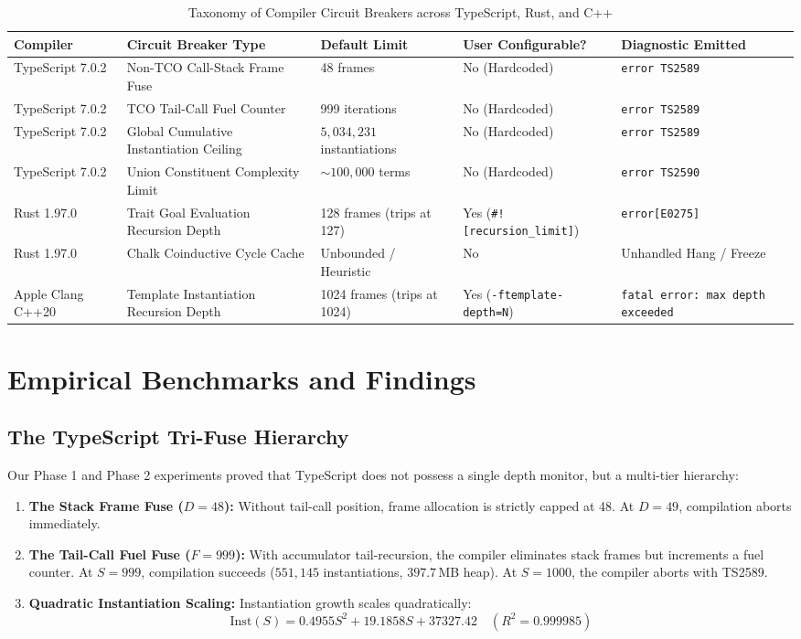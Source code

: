 \documentclass[10pt,journal,compsoc]{IEEEtran}
\begin{document}
\begin{table}[t]
\centering
\caption{Taxonomy of Compiler Circuit Breakers across TypeScript, Rust, and C++}
\label{tab:circuit_breakers}
\begin{tabular}{@{}lllll@{}}
\toprule
\textbf{Compiler} & \textbf{Circuit Breaker Type} & \textbf{Default Limit} & \textbf{User Configurable?} & \textbf{Diagnostic Emitted} \\ \midrule
TypeScript 7.0.2 & Non-TCO Call-Stack Frame Fuse & 48 frames & No (Hardcoded) & \texttt{error TS2589} \\
TypeScript 7.0.2 & TCO Tail-Call Fuel Counter & 999 iterations & No (Hardcoded) & \texttt{error TS2589} \\
TypeScript 7.0.2 & Global Cumulative Instantiation Ceiling & $5,034,231$ instantiations & No (Hardcoded) & \texttt{error TS2589} \\
TypeScript 7.0.2 & Union Constituent Complexity Limit & $\sim 100,000$ terms & No (Hardcoded) & \texttt{error TS2590} \\
Rust 1.97.0 & Trait Goal Evaluation Recursion Depth & 128 frames (trips at 127) & Yes (\texttt{\#![recursion\_limit]}) & \texttt{error[E0275]} \\
Rust 1.97.0 & Chalk Coinductive Cycle Cache & Unbounded / Heuristic & No & Unhandled Hang / Freeze \\
Apple Clang C++20 & Template Instantiation Recursion Depth & 1024 frames (trips at 1024) & Yes (\texttt{-ftemplate-depth=N}) & \texttt{fatal error: max depth exceeded} \\ \bottomrule
\end{tabular}
\end{table}

\section{Empirical Benchmarks and Findings}

\subsection{The TypeScript Tri-Fuse Hierarchy}
Our Phase 1 and Phase 2 experiments proved that TypeScript does not possess a single depth monitor, but a multi-tier hierarchy:
\begin{enumerate}
    \item \textbf{The Stack Frame Fuse ($D = 48$):} Without tail-call position, frame allocation is strictly capped at 48. At $D = 49$, compilation aborts immediately.
    \item \textbf{The Tail-Call Fuel Fuse ($F = 999$):} With accumulator tail-recursion, the compiler eliminates stack frames but increments a fuel counter. At $S = 999$, compilation succeeds ($551,145$ instantiations, $397.7$\,MB heap). At $S = 1000$, the compiler aborts with TS2589.
    \item \textbf{Quadratic Instantiation Scaling:} Instantiation growth scales quadratically:
    \begin{equation}
    \text{Inst}(S) = 0.4955 S^2 + 19.1858 S + 37327.42 \quad (R^2 = 0.999985)
    \end{equation}
\end{enumerate}
\end{document}
